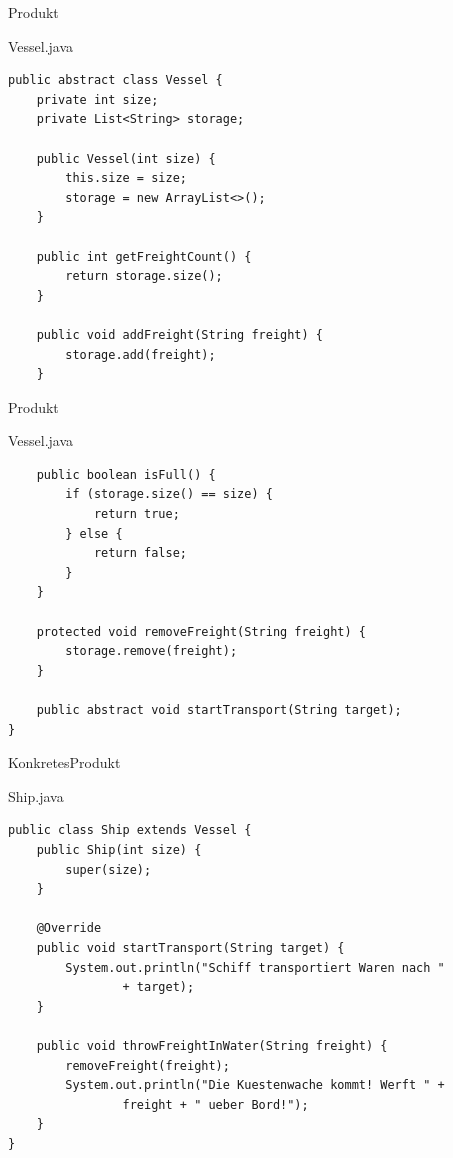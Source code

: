 \begin{frame}[fragile]{Produkt}
	\begin{exampleblock}{Vessel.java}
 		\begin{lstlisting}
public abstract class Vessel {
	private int size;
	private List<String> storage;
	
	public Vessel(int size) {
		this.size = size;
		storage = new ArrayList<>();
	}
	
	public int getFreightCount() {
		return storage.size();
	}
	
	public void addFreight(String freight) {
		storage.add(freight);
	}
 		\end{lstlisting}
 	\end{exampleblock}
\end{frame} 

\begin{frame}[fragile]{Produkt}
	\begin{exampleblock}{Vessel.java}
 		\begin{lstlisting}
	public boolean isFull() {
		if (storage.size() == size) {
			return true;
		} else {
			return false;
		}
	}
	
	protected void removeFreight(String freight) {
		storage.remove(freight);
	}
	
	public abstract void startTransport(String target);
}	    
 		\end{lstlisting}
 	\end{exampleblock}
\end{frame}

\begin{frame}[fragile]{KonkretesProdukt}
	\begin{exampleblock}{Ship.java}
 		\begin{lstlisting}
public class Ship extends Vessel {
	public Ship(int size) {
		super(size);
	}

	@Override
	public void startTransport(String target) {
		System.out.println("Schiff transportiert Waren nach " 
				+ target);
	}
	
	public void throwFreightInWater(String freight) {
		removeFreight(freight);
		System.out.println("Die Kuestenwache kommt! Werft " + 
				freight + " ueber Bord!");
	}
}
 		\end{lstlisting}
 	\end{exampleblock}
\end{frame}

